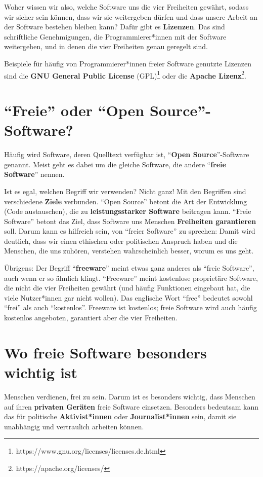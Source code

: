 \documentclass[a5paper,12pt]{scrartcl}
\begin{document}
Woher wissen wir also, welche Software uns die vier Freiheiten
gewährt, sodass wir sicher sein können, dass wir sie weitergeben
dürfen und dass unsere Arbeit an der Software bestehen bleiben kann?
Dafür gibt es \textbf{Lizenzen}. Das sind schriftliche Genehmigungen,
die Programmierer*innen mit der Software weitergeben, und in denen die
vier Freiheiten genau geregelt sind.

Beispiele für häufig von Programmierer*innen freier Software genutzte
Lizenzen sind die \textbf{GNU General Public License}
(GPL)\footnote{https://www.gnu.org/licenses/licenses.de.html} oder die
\textbf{Apache Lizenz}\footnote{https://apache.org/licenses/}.


\section{"`Freie"' oder "`Open Source"'-Software?}

Häufig wird Software, deren Quelltext verfügbar ist, "`\textbf{Open
  Source}"'-Software genannt. Meist geht es dabei um die gleiche
Software, die andere "`\textbf{freie Software}"' nennen.

Ist es egal, welchen Begriff wir verwenden? Nicht ganz! Mit den
Begriffen sind verschiedene \textbf{Ziele} verbunden. "`Open Source"'
betont die Art der Entwicklung (Code austauschen), die zu
\textbf{leistungsstarker Software} beitragen kann. "`Freie Software"'
betont das Ziel, dass Software uns Menschen \textbf{Freiheiten
  garantieren} soll. Darum kann es hilfreich sein, von "`freier
Software"' zu sprechen: Damit wird deutlich, dass wir einen ethischen
oder politischen Anspruch haben und die Menschen, die uns zuhören,
verstehen wahrscheinlich besser, worum es uns geht.

Übrigens: Der Begriff "`\textbf{freeware}"' meint etwas ganz anderes
als "`freie Software"', auch wenn er so ähnlich klingt. "`Freeware"'
meint kostenlose proprietäre Software, die nicht die vier Freiheiten
gewährt (und häufig Funktionen eingebaut hat, die viele Nutzer*innen
gar nicht wollen). Das englische Wort "`free"' bedeutet sowohl
"`frei"' als auch "`kostenlos"'. Freeware ist kostenlos; freie
Software wird auch häufig kostenlos angeboten, garantiert aber die
vier Freiheiten.


\section{Wo freie Software besonders wichtig ist}

Menschen verdienen, frei zu sein. Darum ist es besonders wichtig, dass
Menschen auf ihren \textbf{privaten Geräten} freie Software
einsetzen. Besonders bedeutsam kann das für politische
\textbf{Aktivist*innen} oder \textbf{Journalist*innen} sein, damit sie
unabhängig und vertraulich arbeiten können.
\end{document}
